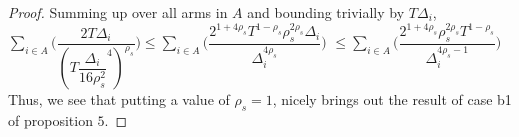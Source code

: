 \begin{proof}
\newline
Summing up over all arms in $A$ and bounding trivially by $T\Delta_{i}$,
\newline\hspace*{4em} $\sum_{i\in A}\bigg(\dfrac{2T\Delta_{i}}{(T\dfrac{\Delta_{i}}{16\rho_{s}^{2}}^{4})^{\rho_{s}}}\bigg)\leq \sum_{i\in A}\bigg(\dfrac{2^{1+4\rho_{s}}T^{1-\rho_{s}}\rho_{s}^{2\rho_{s}}\Delta_{i}}{\Delta_{i}^{4\rho_{s}}}\bigg)$
\newline\hspace*{12em}
$\leq \sum_{i\in A}\bigg(\dfrac{2^{1+4\rho_{s}}\rho_{s}^{2\rho_{s}}T^{1-\rho_{s}}}{\Delta_{i}^{4\rho_{s}-1}}\bigg)$
\newline Thus, we see that putting a value of $\rho_{s}=1$, nicely brings out the result of case b1 of proposition $5$.



\end{proof}
